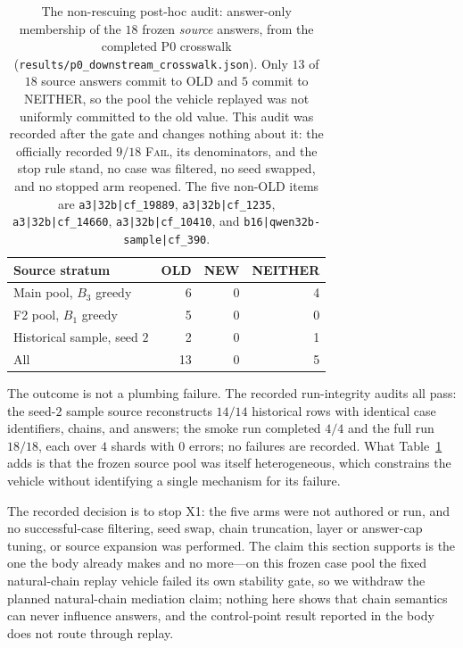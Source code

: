 \documentclass[letterpaper]{article}
\begin{document}
\begin{table}[t]
\centering
\small
\begin{tabular}{lrrr}
\toprule
Source stratum & OLD & NEW & NEITHER \\
\midrule
Main pool, \(B_3\) greedy & 6 & 0 & 4 \\
F2 pool, \(B_1\) greedy & 5 & 0 & 0 \\
Historical sample, seed \(2\) & 2 & 0 & 1 \\
\midrule
All & 13 & 0 & 5 \\
\bottomrule
\end{tabular}
\caption{The non-rescuing post-hoc audit: answer-only membership of the \(18\)
frozen \emph{source} answers, from the completed P0 crosswalk
(\texttt{results/p0\_downstream\_crosswalk.json}).  Only \(13\) of \(18\) source
answers commit to OLD and \(5\) commit to NEITHER, so the pool the vehicle
replayed was not uniformly committed to the old value.  This audit was recorded
after the gate and changes nothing about it: the officially recorded \(9/18\)
\textsc{Fail}, its denominators, and the stop rule stand, no case was filtered,
no seed swapped, and no stopped arm reopened.  The five non-OLD items are
\texttt{a3|32b|cf\_19889}, \texttt{a3|32b|cf\_1235},
\texttt{a3|32b|cf\_14660}, \texttt{a3|32b|cf\_10410}, and
\texttt{b16|qwen32b-sample|cf\_390}.}
\label{tab:x1-posthoc}
\end{table}

The outcome is not a plumbing failure.  The recorded run-integrity audits all
pass: the seed-\(2\) sample source reconstructs \(14/14\) historical rows with
identical case identifiers, chains, and answers; the smoke run completed
\(4/4\) and the full run \(18/18\), each over \(4\) shards with \(0\) errors;
no failures are recorded.  What Table~\ref{tab:x1-posthoc} adds is that the
frozen source pool was itself heterogeneous, which constrains the vehicle
without identifying a single mechanism for its failure.

The recorded decision is to stop X1: the five arms were not authored or run, and
no successful-case filtering, seed swap, chain truncation, layer or answer-cap
tuning, or source expansion was performed.  The claim this section supports is
the one the body already makes and no more---on this frozen case pool the fixed
natural-chain replay vehicle failed its own stability gate, so we withdraw the
planned natural-chain mediation claim; nothing here shows that chain semantics
can never influence answers, and the control-point result reported in the body
does not route through replay.
\end{document}
